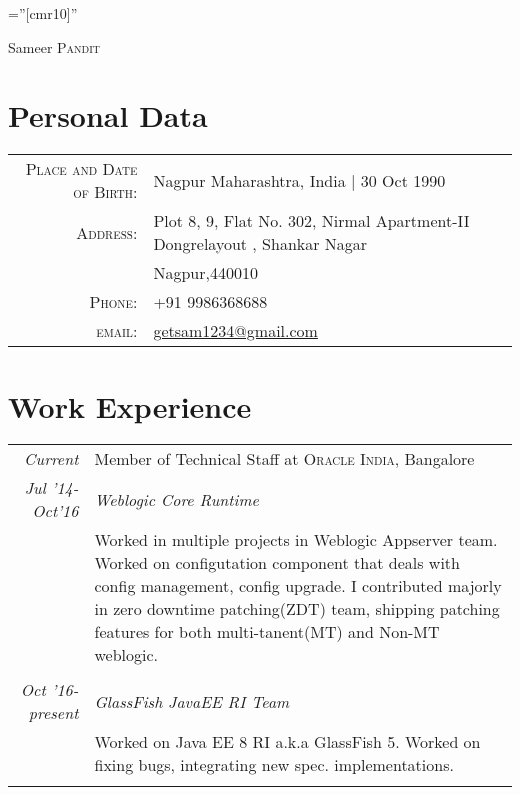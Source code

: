 \documentclass[a4paper,10pt]{article}
\begin{document}

\pagestyle{empty} %

\font\fb=''[cmr10]'' %

\par{\centering
		{\Huge Sameer \textsc{Pandit}
	}\bigskip\par}

\section{Personal Data}

\begin{tabular}{rl}
    \textsc{Place and Date of Birth:} & Nagpur Maharashtra, India  | 30 Oct 1990 \\
    \textsc{Address:}   & Plot 8, 9, Flat No. 302, Nirmal Apartment-II Dongrelayout , Shankar Nagar\\&\normalsize Nagpur,440010\\
    \textsc{Phone:}     & +91 9986368688\\
    \textsc{email:}     & \href{mailto:getsam1234@gmail.com}{getsam1234@gmail.com}
\end{tabular}

\section{Work Experience}
\begin{tabular}{r|p{15cm}}
 \emph{Current} & Member of Technical Staff at \textsc{Oracle India}, Bangalore \\
 \emph{Jul '14-Oct'16}&\emph{Weblogic Core Runtime}\\ &\footnotesize{Worked in multiple projects in Weblogic Appserver team. Worked on configutation component that deals with config management, config upgrade. I contributed majorly in zero downtime patching(ZDT) team, shipping patching features for both multi-tanent(MT) and Non-MT weblogic.}\\
  \multicolumn{2}{c}{} \\
 \emph{Oct '16-present}&\emph{GlassFish JavaEE RI Team}\\&\footnotesize{Worked on Java EE 8 RI a.k.a GlassFish 5. Worked on fixing bugs, integrating new spec. implementations.}\\
 \multicolumn{2}{c}{} \\
\end{tabular}
\end{document}
